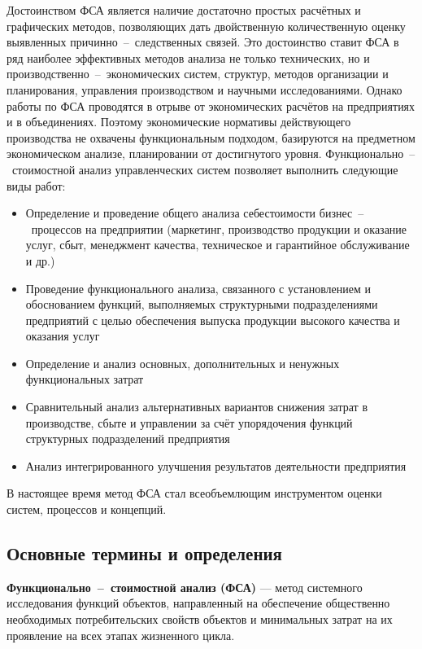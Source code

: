 Достоинством ФСА является наличие достаточно простых расчётных и графических
методов, позволяющих дать двойственную количественную оценку выявленных
причинно~--~следственных связей. Это достоинство ставит ФСА в ряд наиболее
эффективных методов анализа не только технических, но и
производственно~--~экономических систем, структур, методов организации и
планирования, управления производством и научными исследованиями. Однако работы
по ФСА проводятся в отрыве от экономических расчётов на предприятиях и в
объединениях.
Поэтому экономические нормативы действующего производства не охвачены
функциональным подходом, базируются на предметном экономическом анализе,
планировании от достигнутого уровня.
Функционально~--~стоимостной анализ управленческих систем позволяет выполнить
следующие виды работ:
\begin{itemize}
    \item Определение и проведение общего анализа себестоимости
    бизнес~--~процессов на предприятии (маркетинг, производство продукции и
    оказание услуг, сбыт, менеджмент качества, техническое и гарантийное
    обслуживание и др.)
    \item Проведение функционального анализа, связанного с установлением и
    обоснованием функций, выполняемых структурными подразделениями предприятий с
    целью обеспечения выпуска продукции высокого качества и оказания услуг
    \item Определение и анализ основных, дополнительных и ненужных
    функциональных затрат
    \item Сравнительный анализ альтернативных вариантов снижения затрат в
    производстве, сбыте и управлении за счёт упорядочения функций структурных
    подразделений предприятия
    \item Анализ интегрированного улучшения результатов деятельности
предприятия
\end{itemize}

В настоящее время метод ФСА стал всеобъемлющим инструментом
оценки систем, процессов и концепций.

\newpage
\subsection{Основные термины и определения}

\textbf{Функционально~--~стоимостной анализ (ФСА)} --- метод системного
исследования функций объектов, направленный на обеспечение общественно
необходимых потребительских свойств объектов и минимальных затрат на их
проявление на всех этапах жизненного цикла.

